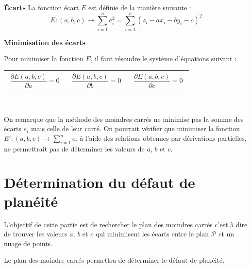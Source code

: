 \begin{defi}\textbf{Écarts}
La fonction écart $E$ est définie de la manière suivante : 
$$
E:(a,b,c)\rightarrow \sum\limits_{i=1}^{n} e_i^2 = \sum\limits_{i=1}^{n} \left(z_i -ax_i -by_i -c\right)^2
$$
\end{defi}


\begin{defi}\textbf{Minimisation des écarts}

Pour minimiser la fonction $E$, il faut résoudre le système d'équations suivant :

\begin{tabular}{p{4cm}p{4cm}p{4cm}}
\begin{eqnarray}\label{eq1}
\dfrac{\partial E(a,b,c)}{\partial a} = 0 
\end{eqnarray}
&
\begin{eqnarray}\label{eq2}
\dfrac{\partial E(a,b,c)}{\partial b} = 0 
\end{eqnarray}
&
\begin{eqnarray}\label{eq3}
\dfrac{\partial E(a,b,c)}{\partial c} = 0 
\end{eqnarray}%
\end{tabular}

\end{defi}



\begin{rappel} ~\\ \vspace{-.25cm}

On remarque que la méthode des moindres carrés ne minimise pas la somme des écarts $e_i$ mais celle de leur carré. On pourrait vérifier que minimiser la fonction $E':(a,b,c)\rightarrow \sum\limits_{i=1}^{n} e_i$ à l’aide des relations obtenues par dérivations partielles, ne permettrait pas de déterminer les valeurs de $a$, $b$ et $c$.
\end{rappel}


\fi
\section{Détermination du défaut de planéité}

\begin{obj}
L'objectif de cette partie est de rechercher le plan des moindres carrés c'est à dire de trouver les valeurs $a$, $b$ et $c$ qui minimisent les écarts entre le plan $\mathcal{P}$ et un nuage de points. 

Le plan des moindre carrés permettra de déterminer le défaut de planéité.
\end{obj}

